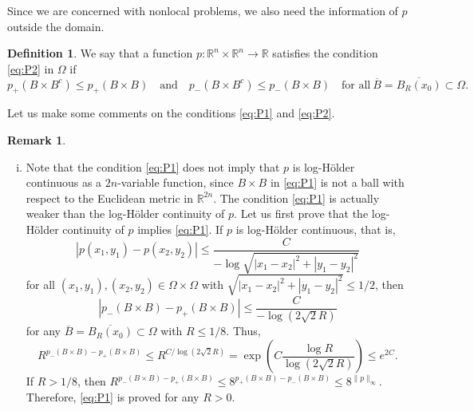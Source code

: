 \documentclass[11pt]{amsart}
\theoremstyle{plain}
\theoremstyle{definition}
\newtheorem{definition}[theorem]{Definition}
\newtheorem{remark}[theorem]{Remark}
\numberwithin{equation}{section}
\begin{document}
Since we are concerned with nonlocal problems, we also need the information of $p$ outside the domain.

\begin{definition}
We say that a function $p: \mathbb{R}^n \times \mathbb{R}^n \to \mathbb{R}$ satisfies the condition \eqref{eq:P2} in $\Omega$ if
\begin{equation} \label{eq:P2} \tag{P2}
p_+(B \times B^c) \leq p_+(B\times B) \quad\text{and}\quad p_-(B \times B^c) \leq p_-(B\times B) \quad\text{for all}~ \overline{B} = \overline{B_R(x_0)} \subset \Omega.
\end{equation}
\end{definition}

Let us make some comments on the conditions \eqref{eq:P1} and \eqref{eq:P2}.

\begin{remark}{\,  }
\begin{enumerate}[(i)]
\item
Note that the condition \eqref{eq:P1} does not imply that $p$ is log-H\"older continuous as a $2n$-variable function, since $B \times B$ in \eqref{eq:P1} is not a ball with respect to the Euclidean metric in $\mathbb{R}^{2n}$. The condition \eqref{eq:P1} is actually weaker than the log-H\"older continuity of $p$. Let us first prove that the log-H\"older continuity of $p$ implies \eqref{eq:P1}. If $p$ is log-H\"older continuous, that is,
\begin{equation*}
|p(x_1, y_1)-p(x_2, y_2)| \leq \frac{C}{-\log \sqrt{|x_1-x_2|^2 + |y_1-y_2|^2}}
\end{equation*}
for all $(x_1, y_1), (x_2, y_2) \in \Omega \times \Omega$ with $\sqrt{|x_1-x_2|^2 + |y_1-y_2|^2} \leq 1/2$, then
\begin{equation*}
|p_-(B \times B) - p_+(B \times B)| \leq \frac{C}{-\log (2\sqrt{2}R)}
\end{equation*}
for any $\overline{B} = \overline{B_R(x_0)} \subset \Omega$ with $R \leq 1/8$. Thus, 
\begin{equation*}
R^{p_-(B\times B) - p_+(B\times B)} \leq R^{C/\log(2\sqrt{2}R)} = \exp\left( C\frac{\log R}{\log(2\sqrt{2}R)} \right) \leq e^{2C}.
\end{equation*}
If $R > 1/8$, then $R^{p_-(B\times B) - p_+(B\times B)} \leq 8^{p_+(B\times B) - p_-(B\times B)} \leq 8^{\|p\|_\infty}$. Therefore, \eqref{eq:P1} is proved for any $R > 0$.


\end{enumerate}
\end{remark}
\end{document}
